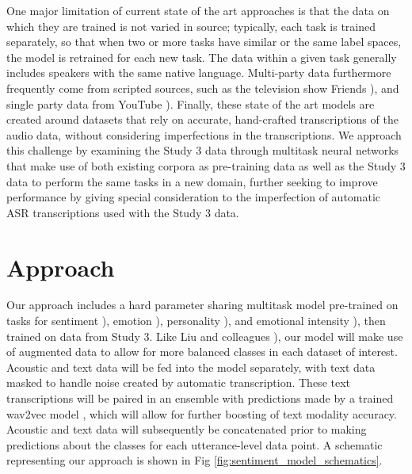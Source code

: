 One major limitation of current state of the art approaches is that the data
on which they are trained is not varied in source; typically, each task is
trained separately, so that when two or more tasks have similar or the same
label spaces, the model is retrained for each new task. The data within a
given task generally includes speakers with the same native language.
Multi-party data furthermore frequently come from scripted sources, such as
the television show Friends \citep{Poria.ea:2019, Zhu.ea:2021}), and single party
data from YouTube \citep{Zadeh.ea:2016, Ponce-Lopez.ea:2016}). Finally, these
state of the art models are created around datasets that rely on accurate,
hand-crafted transcriptions of the audio data, without considering
imperfections in the transcriptions. We approach this challenge by examining
the Study 3 data through multitask neural networks that make use of both
existing corpora as pre-training data as well as the Study 3 data to perform
the same tasks in a new domain, further seeking to improve performance by
giving special consideration to the imperfection of automatic ASR
transcriptions used with the Study 3 data. 


\section{Approach}

Our approach includes a hard parameter sharing multitask model pre-trained on
tasks for sentiment \citep{Zadeh.ea:2016}), emotion \citep{Poria.ea:2019}),
personality \citep{Ponce-Lopez.ea:2016}), and emotional intensity
\citep{Livingstone.ea:2018}), then trained on data from Study 3. Like Liu and
colleagues \citep{Liu.ea:2021}), our model will make use of augmented data to
allow for more balanced classes in each dataset of interest.  Acoustic and text
data will be fed into the model separately, with text data masked to handle
noise created by automatic transcription. These text transcriptions will be
paired in an ensemble with predictions made by a trained wav2vec model
\citep{Schneider.ea:2019}, which will allow for further boosting of text
modality accuracy. Acoustic and text data will subsequently be concatenated
prior to making predictions about the classes for each utterance-level data
point. A schematic representing our approach is shown in Fig
\ref{fig:sentiment_model_schematics}. 

